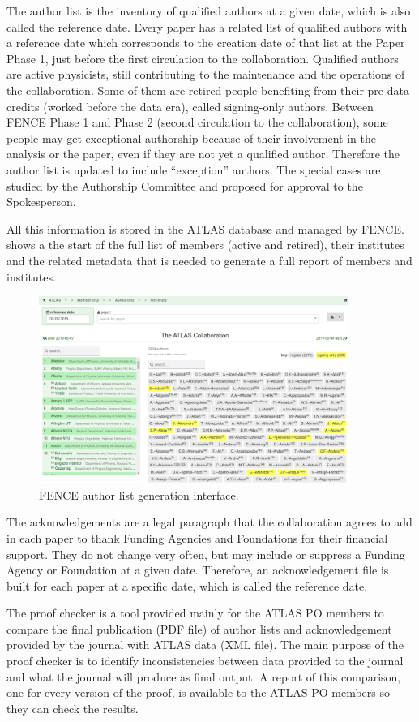 The author list is the inventory of qualified authors at a given date, which is also called the reference date. Every paper has a related list of qualified authors with a reference date which corresponds to the creation date of that list at the Paper Phase 1, just before the first circulation to the collaboration. Qualified authors are active physicists, still contributing to the maintenance and the operations of the collaboration.
Some of them are retired people benefiting from their pre-data credits (worked before the data era), called signing-only authors.
Between FENCE Phase 1 and Phase 2 (second circulation to the collaboration), some people may get exceptional authorship because of their involvement in the analysis or the paper,
even if they are not yet a qualified author.
Therefore the author list is updated to include \enquote{exception} authors.
The special cases are studied by the Authorship Committee and proposed for approval to the Spokesperson.
 
All this information is stored in the ATLAS database and managed by FENCE.
 shows a the start of the full list of members (active and retired), their institutes and the related metadata that is needed to generate a full report of members and institutes.

\begin{figure}[htb]
  \centering
  \includegraphics[width=0.9\textwidth]{figures/authorlist_generation.png}
  \caption{FENCE author list generation interface.}
  \label{fig:authorlist_generation}
\end{figure}

The acknowledgements are a legal paragraph that the collaboration agrees to add in each paper to thank Funding Agencies and Foundations for their financial support.
They do not change very often, but may include or suppress a Funding Agency or Foundation at a given date.
Therefore, an acknowledgement file is built for each paper at a specific date, which is called the reference date.
 
The proof checker is a tool provided mainly for the ATLAS PO members to compare the final publication (PDF file) of author lists and acknowledgement provided by the journal with ATLAS data (XML file). The main purpose of the proof checker is to identify inconsistencies between data provided to the journal and what the journal will produce as final output. A report of this comparison, one for every version of the proof, is available to the ATLAS PO members so they can check the results.
